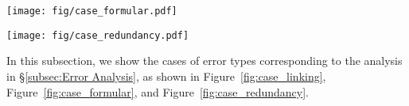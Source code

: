 \begin{figure*}[t]
    \centering
    \texttt{[image: fig/case\_formular.pdf]}
    \caption{
    The case for the error type of "Formula".
    }
    \label{fig:case_formular}
\end{figure*}

\begin{figure*}[t]
    \centering
    \texttt{[image: fig/case\_redundancy.pdf]}
    \caption{
    The case for the error type of "Redundancy".
    }
    \label{fig:case_redundancy}
\end{figure*}

In this subsection, we show the cases of error types corresponding to the analysis in \S\ref{subsec:Error Analysis}, as shown in Figure~\ref{fig:case_linking}, Figure~\ref{fig:case_formular}, and Figure~\ref{fig:case_redundancy}.